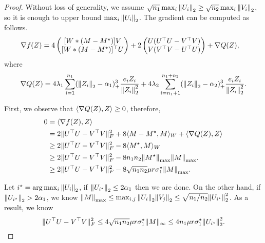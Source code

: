 \begin{proof}
Without loss of generality, we assume $\sqrt{n_1}\max_i{\lVert U_i{\rVert}}_2 \ge \sqrt{n_2}\max_i{\lVert V_i{\rVert}}_2$, so it is enough to upper bound $\max_i {\lVert U_i{\rVert}}_2$. The gradient can be computed as follows.
\begin{align*}
\grad f(Z) & =
4 \begin{pmatrix}
[W*(M -\Ms)] V \\
[W*(M -\Ms)]^\top U
\end{pmatrix}
+
2 \begin{pmatrix}
 U(U^\top U - V^\top V) \\
 V(V^\top V - U^\top U)
\end{pmatrix}
+
 \grad Q(Z),
\end{align*}
where %
\begin{equation*}
\nabla Q(Z) = 4\lambda_1 \sum_{i=1}^{n_1}({\lVert Z_i{\rVert}}_2 - \alpha_1)^3_{+}\frac{e_i Z_i}{{\lVert Z_i{\rVert}}_2^2} 
+ 4\lambda_2 \sum_{i=n_1+1}^{n_1+n_2}({\lVert Z_i{\rVert}}_2 - \alpha_2)^3_{+}\frac{e_i Z_i}{{\lVert Z_i{\rVert}}_2^2}.
\end{equation*}

First, we observe that $\langle \nabla Q(Z), Z\rangle \ge 0$, therefore,
\begin{align*}
0 & = \langle \nabla f(Z), Z\rangle \\
& = 2 \|U^\top U - V^\top V\|_F^2 + 8 \langle M - M^\star, M\rangle_W + \langle \nabla Q(Z),Z\rangle \\
& \ge 2 \|U^\top U - V^\top V\|_F^2 - 8 \langle M^\star, M\rangle_W \\
& \ge 2 \|U^\top U - V^\top V\|_F^2 - 8n_1n_2 {\lVert M^\star{\rVert}}_{\max} {\lVert M{\rVert}}_{\max}. \\
& \ge 2 \|U^\top U - V^\top V\|_F^2 - 8\sqrt{n_1n_2}\mu r\sigma^\star_1 {\lVert M{\rVert}}_{\max}.
\end{align*}

Let $i^\star = \arg\max_i {\lVert U_i{\rVert}}_2$, if ${\lVert U_{i^\star}{\rVert}}_2 \le 2 \alpha_1$ then we are done. On the other hand, if ${\lVert U_{i^\star}{\rVert}}_2 > 2\alpha_1$, we know ${\lVert M{\rVert}}_{\max} \le \max_{i,j} {\lVert U_i{\rVert}}_2{\lVert V_j{\rVert}}_2 \le \sqrt{n_1/n_2} {\lVert U_{i^\star}{\rVert}}_2^2$. 
As a result, we know 
\[
\|U^\top U - V^\top V\|_F^2 \le 4\sqrt{n_1n_2}\mu r\sigma^\star_1\|M\|_\infty \le 4n_1\mu r \sigma^\star_1{\lVert U_{i^\star}{\rVert}}_2^2.
\]


\end{proof}
